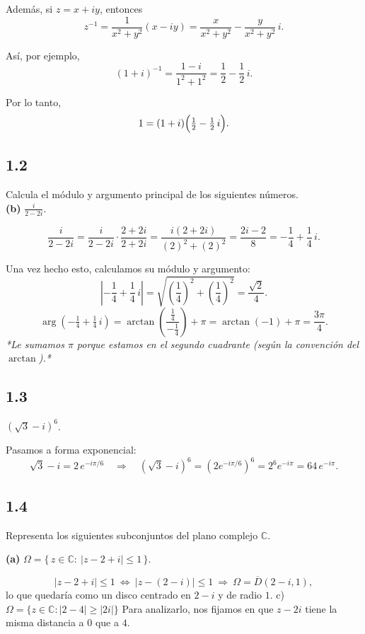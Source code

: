 \documentclass[a4paper,12pt]{article}
\begin{document}
Además, si \(z=x+iy\), entonces
\[
z^{-1}=\frac{1}{x^{2}+y^{2}}(x-iy)
= \frac{x}{x^{2}+y^{2}}-\frac{y}{x^{2}+y^{2}}\,i .
\]

Así, por ejemplo,
\[
(1+i)^{-1}=\frac{1-i}{1^{2}+1^{2}}=\frac12-\frac12\,i .
\]

Por lo tanto,
\[
1=(1+i)\Bigl(\tfrac12-\tfrac12\,i\Bigr).
\]

\subsection*{1.2} Calcula el módulo y argumento principal de los siguientes números.\\[2pt]
\textbf{(b)} \(\displaystyle \frac{i}{2-2i}\).

\[
\frac{i}{2-2i}
=\frac{i}{2-2i}\cdot\frac{2+2i}{2+2i}
=\frac{i(2+2i)}{(2)^{2}+(2)^{2}}
=\frac{2i-2}{8}
=-\frac{1}{4}+\frac{1}{4}\,i .
\]

Una vez hecho esto, calculamos su módulo y argumento:
\[
\left|-\frac14+\frac14\,i\right|
=\sqrt{\left(\frac14\right)^{2}+\left(\frac14\right)^{2}}
=\frac{\sqrt2}{4}.
\]
\[
\arg\!\left(-\tfrac14+\tfrac14\,i\right)
=\arctan\!\left(\frac{\,\tfrac14\,}{-\tfrac14}\right)+\pi
=\arctan(-1)+\pi=\frac{3\pi}{4}.
\]
\emph{*Le sumamos \(\pi\) porque estamos en el segundo cuadrante (según la convención del \(\arctan\)).*}

\subsection*{1.3} \(\displaystyle (\sqrt{3}-i)^{6}\).

Pasamos a forma exponencial:
\[
\sqrt{3}-i=2\,e^{-i\pi/6}
\quad\Longrightarrow\quad
(\sqrt{3}-i)^{6}=(2e^{-i\pi/6})^{6}=2^{6}e^{-i\pi}=64\,e^{-i\pi}.
\]

\subsection*{1.4} Representa los siguientes subconjuntos del plano complejo \(\mathbb{C}\).

\textbf{(a)} \(\displaystyle \Omega=\{\,z\in\mathbb{C}:\ |z-2+i|\le 1\,\}\).

\[
|z-2+i|\le 1\ \Longleftrightarrow\ |z-(2-i)|\le 1
\ \Longrightarrow\ 
\Omega=\overline{D}(2-i,1),
\]
lo que quedaría como un disco centrado en \(2-i\) y de radio \(1\).
c) $\Omega = \{ z \in \mathbb{C} : |2 - 4| \geq |2i| \}$  
Para analizarlo, nos fijamos en que $z - 2i$ tiene la misma distancia a $0$ que a $4$.
\end{document}
